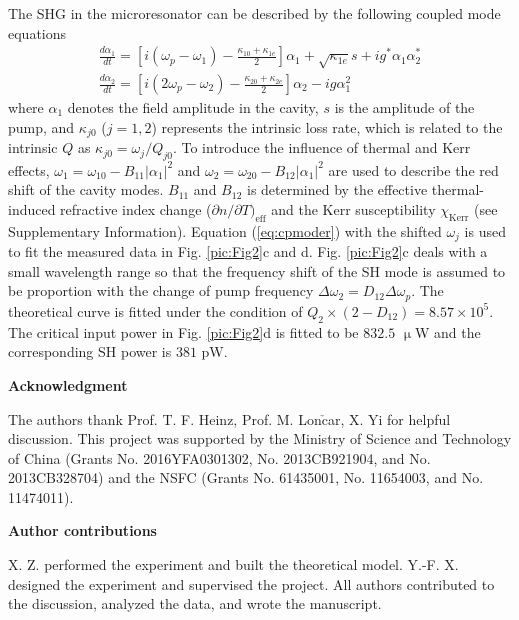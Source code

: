 \documentclass[a4paper,8pt,hyperref, twocolumn, aps, prl]{article}
\begin{document}
\noindent The SHG in the microresonator can be described by the following coupled mode equations
\begin{gather}
\frac{d{\alpha}_1}{dt} = [i(\omega_p-\omega_1)-\frac{\kappa_{10}+\kappa_{1e}}{2}]{\alpha}_1+\sqrt{\kappa_{1e}}s+ig^*{\alpha}_1{\alpha}_2^* \\
\frac{d{\alpha}_2}{dt} = [i(2\omega_p-\omega_2)-\frac{\kappa_{20}+\kappa_{2e}}{2}]{\alpha}_2-ig{\alpha}_1^2
\label{eq:cpmoder}
\end{gather}
where ${\alpha}_1$ denotes the field amplitude in the cavity, $s$ is the amplitude of the pump, and $\kappa_{j0}$ ($j = 1,2$) represents the intrinsic loss rate, which is related to the intrinsic $Q$ as $\kappa_{j0} = \omega_{j}/Q_{j0}$. 
To introduce the influence of thermal and Kerr effects, $\omega_1 =\omega_{10} -B_{11}|\alpha_1|^2$ and $\omega_2 =\omega_{20} -B_{12}|\alpha_1|^2$ are used to describe the red shift of the cavity modes.
$B_{11}$ and $B_{12}$ is determined by the effective thermal-induced refractive index change (${\partial n}/{\partial T})_{\mathrm{eff}}$ and the Kerr susceptibility $\chi_{\mathrm{Kerr}}$ (see Supplementary Information).
Equation (\ref{eq:cpmoder}) with the shifted $\omega_j$ is used to fit the measured data in Fig. \ref{pic:Fig2}c and d.
Fig. \ref{pic:Fig2}c deals with a small wavelength range so that the frequency shift of the SH mode is assumed to be proportion with the change of pump frequency $\Delta \omega_2 = D_{12}\Delta \omega_p$.
The theoretical curve is fitted under the condition of $Q_2\times(2-D_{12})=8.57\times 10^5$.
The critical input power in Fig. \ref{pic:Fig2}d is fitted to be $832.5$ $\upmu$W and the corresponding SH power is $381$ pW.



\bigskip
\noindent \textbf{\large Acknowledgment}

\noindent The authors thank Prof. T. F. Heinz, Prof. M. Lon$\mathrm{\check{c}}$ar, X. Yi for helpful discussion. 
This project was supported by the Ministry of Science
and Technology of China (Grants No. 2016YFA0301302,
No. 2013CB921904, and No. 2013CB328704) and the NSFC
(Grants No. 61435001, No. 11654003, and No. 11474011).

\bigskip
\noindent \textbf{\large Author contributions}

\noindent X. Z. performed the experiment and built the theoretical model. Y.-F. X. designed the
experiment and supervised the project. All authors contributed
to the discussion, analyzed the data, and wrote the
manuscript.
\end{document}
